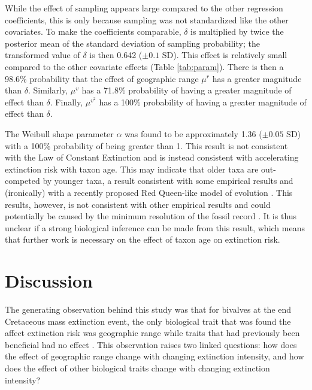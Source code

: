 \documentclass[11pt]{article}
\begin{document}
While the effect of sampling appears large compared to the other regression coefficients, this is only because sampling was not standardized like the other covariates. To make the coefficients comparable, \(\delta\) is multiplied by twice the posterior mean of the standard deviation of sampling probability; the transformed value of \(\delta\) is then 0.642 (\(\pm 0.1\) SD). This effect is relatively small compared to the other covariate effects (Table \ref{tab:param}). There is then a 98.6\% probability that the effect of geographic range \(\mu^{r}\) has a greater magnitude than \(\delta\). Similarly, \(\mu^{v}\) has a 71.8\% probability of having a greater magnitude of effect than \(\delta\). Finally, \(\mu^{v^{2}}\) has a 100\% probability of having a greater magnitude of effect than \(\delta\).

The Weibull shape parameter \(\alpha\) was found to be approximately 1.36 (\(\pm 0.05\) SD) with a 100\% probability of being greater than 1. This result is not consistent with the Law of Constant Extinction \citep{VanValen1973} and is instead consistent with accelerating extinction risk with taxon age. This may indicate that older taxa are out-competed by younger taxa, a result consistent with some empirical results \citep{Wagner2014b,Quental2013,Smits2015} and (ironically) with a recently proposed Red Queen-like model of evolution \citep{Rosindell2015a}. This results, however, is not consistent with other empirical results \citep{Finnegan2008,Crampton2016} and could potentially be caused by the minimum resolution of the fossil record \citep{Sepkoski1975}. It is thus unclear if a strong biological inference can be made from this result, which means that further work is necessary on the effect of taxon age on extinction risk.




\section*{Discussion}

The generating observation behind this study was that for bivalves at the end Cretaceous mass extinction event, the only biological trait that was found the affect extinction risk was geographic range while traits that had previously been beneficial had no effect \citep{Jablonski1986}. This observation raises two linked questions: how does the effect of geographic range change with changing extinction intensity, and how does the effect of other biological traits change with changing extinction intensity?
\end{document}
